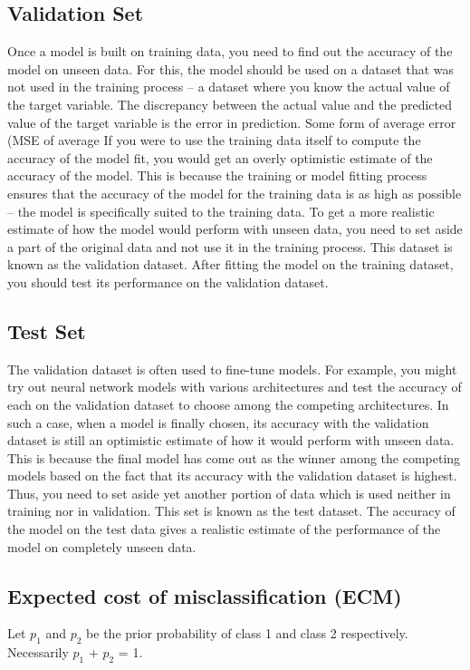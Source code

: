 \documentclass[a4paper,12pt]{article}
\begin{document}
\subsection*{Validation Set}
Once a model is built on training data, you need to find out the accuracy of the model on unseen data. For this, the model should be used on a dataset that was not used in the training process -- a dataset where you know the actual value of the target variable. The discrepancy between the actual value and the predicted value of the target variable is the error in prediction. Some form of average error (MSE of average %
If you were to use the training data itself to compute the accuracy of the model fit, you would get an overly optimistic estimate of the accuracy of the model. This is because the training or model fitting process ensures that the accuracy of the model for the training data is as high as possible -- the model is specifically suited to the training data. To get a more realistic estimate of how the model would perform with unseen data, you need to set aside a part of the original data and not use it in the training process. This dataset is known as the validation dataset. After fitting the model on the training dataset, you should test its performance on the validation dataset.
\subsection*{Test Set}
The validation dataset is often used to fine-tune models. For example, you might try out neural network models with various architectures and test the accuracy of each on the validation dataset to choose among the competing architectures. In such a case, when a model is finally chosen, its accuracy with the validation dataset is still an optimistic estimate of how it would perform with unseen data. This is because the final model has come out as the winner among the competing models based on the fact that its accuracy with the validation dataset is highest. Thus, you need to set aside yet another portion of data which is used neither in training nor in validation. This set is known as the test dataset. The accuracy of the model on the test data gives a realistic estimate of the performance of the model on completely unseen data.

\newpage




\subsection{Expected cost of misclassification (ECM)}
Let $p_1$ and $p_2$ be the prior probability of class 1 and class 2 respectively.
Necessarily $p_1$ + $p_2$ = 1.
\end{document}
